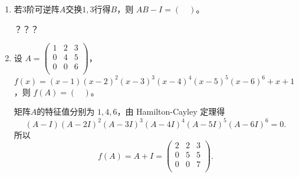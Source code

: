 \begin{enumerate}[1~]
\begin{enumerate}[1.~]
\item
若$3$阶可逆阵$A$交换$1, 3$行得$B$，则 $AB-I = (\quad)$。
\begin{solution}
？？？
\end{solution}

\item
设 $A=\left( \begin{smallmatrix}
	1&		2&		3\\
	0&		4&		5\\
	0&		0&		6\\
\end{smallmatrix} \right) $，$f(x) = (x - 1)(x - 2)^2(x - 3)^3(x - 4)^4(x - 5)^5(x - 6)^6 + x + 1$，则 $f(A) = (\ \ \ \ )$。
\begin{solution}
矩阵$A$的特征值分别为 $1, 4, 6$，由 Hamilton-Cayley 定理得
$$(A-I)(A-2I)^2(A-3I)^3(A-4I)^4(A-5I)^5(A-6I)^6 = 0.$$
所以
$$f(A) = A+I=\left( \begin{matrix}
	2&		2&		3\\
	0&		5&		5\\
	0&		0&		7\\
\end{matrix} \right). $$
\end{solution}
\end{enumerate}


\end{enumerate}

